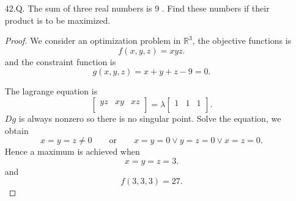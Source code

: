 \begin{itemize}
\begin{proof}
Rearrange the equations we have
\[
	\lambda = \frac{a x_0 + b y_0}{x_0} = \frac{b x_0 + c y_0}{y_0}
.\] 
Also
\[
	f(x_0,y_0) = a x_0^2 + 2 b x_0 y_0 + c y_0^2
.\] 
I could not show that $f(x_0,y_0)$ is equal to $\lambda$.


\end{proof}
\begin{correction}
	On the other hand, the $2 \times 2$ linear system has a nonzero solution iff
\[
\operatorname{det}\left[\begin{array}{cc}
a-\lambda & b \\
b & c-\lambda
\end{array}\right]=\lambda^2-(a+c) \lambda+\left(a c-b^2\right)=0
\]
Note: $\lambda$ is an eigenvalue of the system, and $(x_0, y_0)$ is the corresponding eigenvector.
	Finally, for the extremum point $\left(x_0, y_0\right)$ with such $\lambda$ we have
\[
f\left(x_0, y_0\right)=\left(x_0, y_0\right)\left[\begin{array}{ll}
a & b \\
b & c
\end{array}\right]\left[\begin{array}{l}
x_0 \\
y_0
\end{array}\right]=\left(x_0, y_0\right) \lambda\left[\begin{array}{l}
x_0 \\
y_0
\end{array}\right]=\lambda\left(x_0^2+y_0^2\right)=\lambda
\]
\end{correction}

\item [42.Q.] The sum of three real numbers is 9 . Find these numbers if their product is to be maximized.
\begin{proof}
	We consider an optimization problem in $\mathbb{R}^3$, the objective functions is 
	\[
		f(x,y,z) = xyz
	.\] 
	and the constraint function is
	\[
		g(x,y,z) = x+y+z -9 = 0
	.\] 

	The lagrange equation is
	\[
		\begin{bmatrix}
			yz & xy & xz \\
		\end{bmatrix}
		= \lambda
		\begin{bmatrix}
			1 & 1 & 1 \\
		\end{bmatrix}
	.\] 
	$Dg$ is always nonzero so there is no singular point. Solve the equation, we obtain
	\[
		x=y=z\neq 0 \qquad \text{or} \qquad x=y= 0 \lor y=z=0 \lor x=z=0
	.\] 
	Hence a maximum is achieved when
	\[
		x=y=z=3
	.\] 
	and
	\[
		f(3,3,3) = 27
	.\] 


\end{proof}
\end{itemize}
